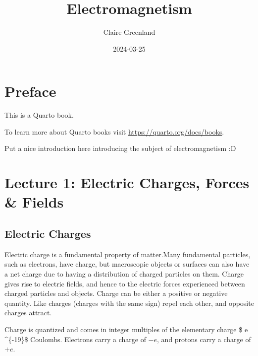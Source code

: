 \documentclass[
  letterpaper,
  DIV=11,
  numbers=noendperiod]{scrreprt}
\title{Electromagnetism}
\author{Claire Greenland}
\date{2024-03-25}
\renewcommand*\contentsname{Table of contents}
\newcommand\contentsname{Table of contents}
\begin{document}
\maketitle

\renewcommand*\contentsname{Table of contents}
{
\hypersetup{linkcolor=}
\setcounter{tocdepth}{2}
\tableofcontents
}

\chapter*{Preface}\label{preface}


This is a Quarto book.

To learn more about Quarto books visit
\url{https://quarto.org/docs/books}.

Put a nice introduction here introducing the subject of electromagnetism
:D


\chapter{Lecture 1: Electric Charges, Forces \&
Fields}\label{lecture-1-electric-charges-forces-fields}

\newcommand{\E}{\mathrm{\mathbf{E}}}
\newcommand{\F}{\mathrm{\mathbf{F}}}
\newcommand{\r}{\mathrm{\mathbf{r}}}

\section{Electric Charges}\label{electric-charges}

Electric charge is a fundamental property of matter.Many fundamental
particles, such as electrons, have charge, but macroscopic objects or
surfaces can also have a net charge due to having a distribution of
charged particles on them. Charge gives rise to electric fields, and
hence to the electric forces experienced between charged particles and
objects. Charge can be either a positive or negative quantity. Like
charges (charges with the same sign) repel each other, and opposite
charges attract.

Charge is quantized and comes in integer multiples of the elementary
charge \$ e   \^{}\{-19\}\$ Coulombs. Electrons
carry a charge of \(-e\), and protons carry a charge of \(+e\).
\end{document}
